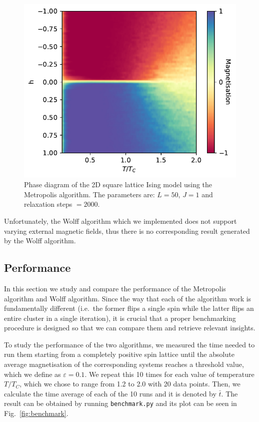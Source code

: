 \documentclass[pra,aps,superscriptaddress,amssymb,amsmath,reprint,noeprint,floatfix]{revtex4-2}
\begin{document}
\begin{figure}[H]
    \centering
    \includegraphics[width=0.9\linewidth]{Figures/phase_diagram.pdf}
    \caption{Phase diagram of the 2D square lattice Ising model using the Metropolis algorithm. The parameters are: $L=50$, $J=1$ and relaxation steps $=2000$.}
    \label{fig:phasediagram}
\end{figure}

Unfortunately, the Wolff algorithm which we implemented does not support varying external magnetic fields, thus there is no corresponding result generated by the Wolff algorithm.

\subsection{\label{subsec:benchmark}Performance}
In this section we study and compare the performance of the Metropolis algorithm and Wolff algorithm. Since the way that each of the algorithm work is fundamentally different (i.e.\ the former flips a single spin while the latter flips an entire cluster in a single iteration), it is crucial that a proper benchmarking procedure is designed so that we can compare them and retrieve relevant insights.

To study the performance of the two algorithms, we measured the time needed to run them starting from a completely positive spin lattice until the absolute average magnetisation of the corresponding systems reaches a threshold value, which we define as $\varepsilon=0.1$. We repeat this 10 times for each value of temperature $T/T_C$, which we chose to range from 1.2 to 2.0 with 20 data points. Then, we calculate the time average of each of the 10 runs and it is denoted by $\bar t$. The result can be obtained by running \texttt{benchmark.py} and its plot can be seen in Fig.\ \ref{fig:benchmark}. 
\end{document}
